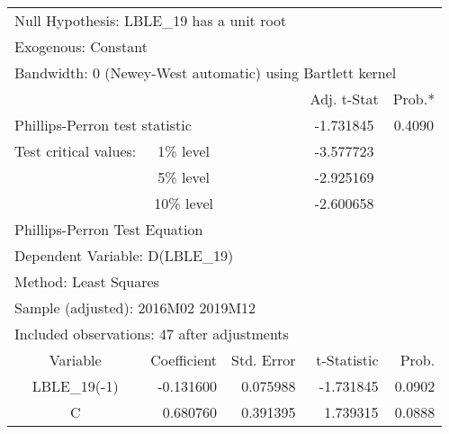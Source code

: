 \begin{tabular}{lrrrr}
\toprule
\multicolumn{3}{l}{Null Hypothesis: LBLE\_19 has a unit root}&\multicolumn{1}{c}{}&\multicolumn{1}{c}{}\\
\multicolumn{2}{l}{Exogenous: Constant}&\multicolumn{1}{c}{}&\multicolumn{1}{c}{}&\multicolumn{1}{c}{}\\
\multicolumn{5}{l}{Bandwidth: 0 (Newey-West automatic) using Bartlett kernel}\\
\midrule
\multicolumn{1}{c}{}&\multicolumn{1}{c}{}&\multicolumn{1}{c}{}&\multicolumn{1}{c}{Adj. t-Stat}&\multicolumn{1}{c}{Prob.*}\\
\midrule
\multicolumn{2}{l}{Phillips-Perron test statistic}&\multicolumn{1}{l}{}&\multicolumn{1}{c}{-1.731845}&\multicolumn{1}{c}{0.4090}\\
\multicolumn{1}{l}{Test critical values:}&\multicolumn{1}{c}{1\% level}&\multicolumn{1}{c}{}&\multicolumn{1}{c}{-3.577723}&\multicolumn{1}{c}{}\\
\multicolumn{1}{c}{}&\multicolumn{1}{c}{5\% level}&\multicolumn{1}{c}{}&\multicolumn{1}{c}{-2.925169}&\multicolumn{1}{c}{}\\
\multicolumn{1}{c}{}&\multicolumn{1}{c}{10\% level}&\multicolumn{1}{c}{}&\multicolumn{1}{c}{-2.600658}&\multicolumn{1}{c}{}\\
\midrule
\multicolumn{2}{l}{Phillips-Perron Test Equation}&\multicolumn{1}{c}{}&\multicolumn{1}{c}{}&\multicolumn{1}{c}{}\\
\multicolumn{3}{l}{Dependent Variable: D(LBLE\_19)}&\multicolumn{1}{c}{}&\multicolumn{1}{c}{}\\
\multicolumn{2}{l}{Method: Least Squares}&\multicolumn{1}{c}{}&\multicolumn{1}{c}{}&\multicolumn{1}{c}{}\\
\multicolumn{3}{l}{Sample (adjusted): 2016M02 2019M12}&\multicolumn{1}{c}{}&\multicolumn{1}{c}{}\\
\multicolumn{4}{l}{Included observations: 47 after adjustments}&\multicolumn{1}{c}{}\\
\midrule
\multicolumn{1}{c}{Variable}&\multicolumn{1}{r}{Coefficient}&\multicolumn{1}{r}{Std. Error}&\multicolumn{1}{r}{t-Statistic}&\multicolumn{1}{r}{Prob.}\\
\midrule
\multicolumn{1}{c}{LBLE\_19(-1)}&\multicolumn{1}{r}{-0.131600}&\multicolumn{1}{r}{0.075988}&\multicolumn{1}{r}{-1.731845}&\multicolumn{1}{r}{0.0902}\\
\multicolumn{1}{c}{C}&\multicolumn{1}{r}{0.680760}&\multicolumn{1}{r}{0.391395}&\multicolumn{1}{r}{1.739315}&\multicolumn{1}{r}{0.0888}\\

\end{tabular}
